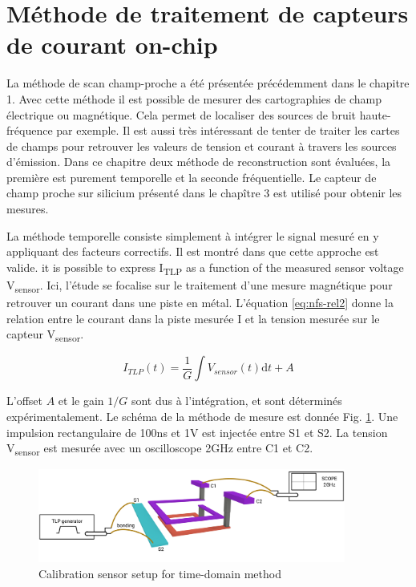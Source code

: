 \section{Méthode de traitement de capteurs de courant on-chip}

La méthode de scan champ-proche a été présentée précédemment dans le chapitre 1.
Avec cette méthode il est possible de mesurer des cartographies de champ électrique ou magnétique.
Cela permet de localiser des sources de bruit haute-fréquence par exemple.
Il est aussi très intéressant de tenter de traiter les cartes de champs pour retrouver les valeurs de tension et courant à travers les sources d'émission.
Dans ce chapitre deux méthode de reconstruction sont évaluées, la première est purement temporelle et la seconde fréquentielle.
Le capteur de champ proche sur silicium présenté dans le chapître 3 est utilisé pour obtenir les mesures.

La méthode temporelle consiste simplement à intégrer le signal mesuré en y appliquant des facteurs correctifs.
Il est montré dans \cite{near-field-scan} que cette approche est valide.
it is possible to express I\textsubscript{TLP} as a function of the measured sensor voltage V\textsubscript{sensor}.
Ici, l'étude se focalise sur le traitement d'une mesure magnétique pour retrouver un courant dans une piste en métal.
L'équation \ref{eq:nfs-rel2} donne la relation entre le courant dans la piste mesurée I et la tension mesurée sur le capteur V\textsubscript{sensor}.

\begin{equation}
I_{TLP}(t) = \frac{1}{G}\int V_{sensor}(t) \mathrm{d}t + A
\label{eq:nfs-rel2}
\end{equation}

L'offset $A$ et le gain $1/G$ sont dus à l'intégration, et sont déterminés expérimentalement.
Le schéma de la méthode de mesure est donnée Fig. \ref{fig:calibration-sensor}.
Une impulsion rectangulaire de 100ns et 1V est injectée entre S1 et S2.
La tension V\textsubscript{sensor} est mesurée avec un oscilloscope 2GHz entre C1 et C2.

\begin{figure}[!h]
  \centering
  \includegraphics[width=0.9\textwidth]{src/1/figures/sensor_measurement_setup.pdf}
  \caption{Calibration sensor setup for time-domain method}
  \label{fig:calibration-sensor}
\end{figure}

